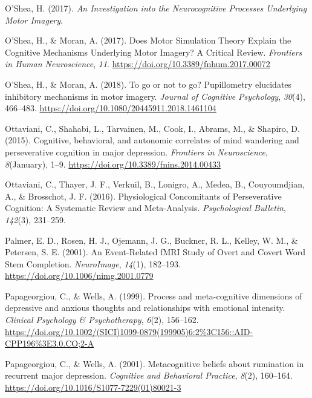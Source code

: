 \documentclass[a4paper,12pt,twoside,onecolumn,openright,final,oldfontcommands]{memoir}
\begin{document}
\leavevmode\hypertarget{ref-oshea_investigation_2017}{}%
O'Shea, H. (2017). \emph{An Investigation into the Neurocognitive Processes Underlying Motor Imagery}.

\leavevmode\hypertarget{ref-oshea_does_2017}{}%
O'Shea, H., \& Moran, A. (2017). Does Motor Simulation Theory Explain the Cognitive Mechanisms Underlying Motor Imagery? A Critical Review. \emph{Frontiers in Human Neuroscience}, \emph{11}. \url{https://doi.org/10.3389/fnhum.2017.00072}

\leavevmode\hypertarget{ref-oshea_go_2018}{}%
O'Shea, H., \& Moran, A. (2018). To go or not to go? Pupillometry elucidates inhibitory mechanisms in motor imagery. \emph{Journal of Cognitive Psychology}, \emph{30}(4), 466--483. \url{https://doi.org/10.1080/20445911.2018.1461104}

\leavevmode\hypertarget{ref-Ottaviani2015}{}%
Ottaviani, C., Shahabi, L., Tarvainen, M., Cook, I., Abrams, M., \& Shapiro, D. (2015). Cognitive, behavioral, and autonomic correlates of mind wandering and perseverative cognition in major depression. \emph{Frontiers in Neuroscience}, \emph{8}(January), 1--9. \url{https://doi.org/10.3389/fnins.2014.00433}

\leavevmode\hypertarget{ref-ottaviani_physiological_2016}{}%
Ottaviani, C., Thayer, J. F., Verkuil, B., Lonigro, A., Medea, B., Couyoumdjian, A., \& Brosschot, J. F. (2016). Physiological Concomitants of Perseverative Cognition: A Systematic Review and Meta-Analysis. \emph{Psychological Bulletin}, \emph{142}(3), 231--259.

\leavevmode\hypertarget{ref-palmer_event-related_2001}{}%
Palmer, E. D., Rosen, H. J., Ojemann, J. G., Buckner, R. L., Kelley, W. M., \& Petersen, S. E. (2001). An Event-Related fMRI Study of Overt and Covert Word Stem Completion. \emph{NeuroImage}, \emph{14}(1), 182--193. \url{https://doi.org/10.1006/nimg.2001.0779}

\leavevmode\hypertarget{ref-papageorgiou_process_1999}{}%
Papageorgiou, C., \& Wells, A. (1999). Process and meta-cognitive dimensions of depressive and anxious thoughts and relationships with emotional intensity. \emph{Clinical Psychology \& Psychotherapy}, \emph{6}(2), 156--162. \url{https://doi.org/10.1002/(SICI)1099-0879(199905)6:2\%3C156::AID-CPP196\%3E3.0.CO;2-A}

\leavevmode\hypertarget{ref-papageorgiou_metacognitive_2001}{}%
Papageorgiou, C., \& Wells, A. (2001). Metacognitive beliefs about rumination in recurrent major depression. \emph{Cognitive and Behavioral Practice}, \emph{8}(2), 160--164. \url{https://doi.org/10.1016/S1077-7229(01)80021-3}
\end{document}
